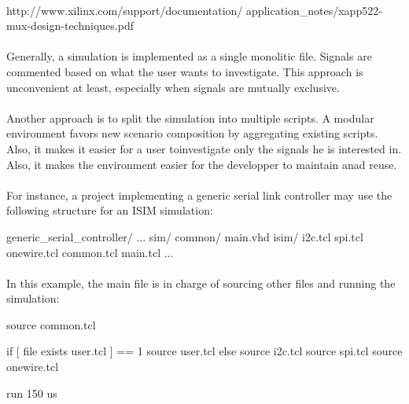 \documentclass[12pt]{article}
\begin{document}
\\
\longurl
{http://www.xilinx.com/support/documentation/}
{application_notes/xapp522-mux-design-techniques.pdf}


\todo{}



\paragraph{}
Generally, a simulation is implemented as a single monolitic file. Signals
are commented based on what the user wants to investigate. This approach is
unconvenient at least, especially when signals are mutually exclusive.
\paragraph{}
Another approach is to split the simulation into multiple scripts. A modular
environment favors new scenario composition by aggregating existing scripts.
Also, it makes it easier for a user toinvestigate only the signals he is
interested in. Also, it makes the environment easier for the developper to
maintain anad reuse.

\paragraph{}
For instance, a project implementing a generic serial link controller may use
the following structure for an ISIM simulation:
\begin{sh}
generic_serial_controller/
 ...
 sim/
  common/
   main.vhd
  isim/
   i2c.tcl
   spi.tcl
   onewire.tcl
   common.tcl
   main.tcl
 ...
\end{sh}

\paragraph{}
In this example, the main file is in charge of sourcing other files
and running the simulation:
\pagebreak
\begin{tcl}
source common.tcl

if { [ file exists user.tcl ] == 1 } {
 source user.tcl
} else {
 source i2c.tcl
 source spi.tcl
 source onewire.tcl
}

run 150 us
\end{tcl}
\end{document}
